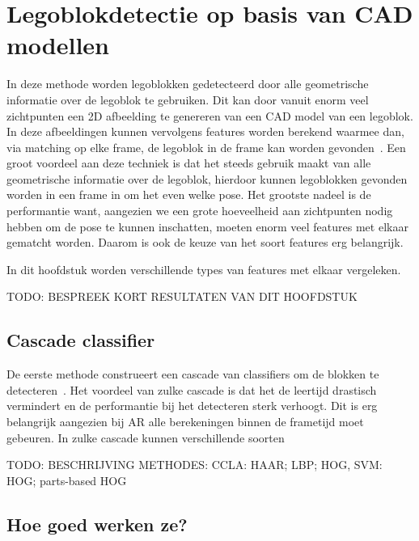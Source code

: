 \chapter{Legoblokdetectie op basis van CAD modellen}
\label{hoofdstuk:3}
In deze methode worden legoblokken gedetecteerd door alle geometrische informatie over de legoblok te gebruiken. Dit kan door vanuit enorm veel zichtpunten een 2D afbeelding te genereren van een CAD model van een legoblok. In deze afbeeldingen kunnen vervolgens features worden berekend waarmee dan, via matching op elke frame, de legoblok in de frame kan worden gevonden~\cite{aubry2014seeing}. Een groot voordeel aan deze techniek is dat het steeds gebruik maakt van alle geometrische informatie over de legoblok, hierdoor kunnen legoblokken gevonden worden in een frame in om het even welke pose. Het grootste nadeel is de performantie want, aangezien we een grote hoeveelheid aan zichtpunten nodig hebben om de pose te kunnen inschatten, moeten enorm veel features met elkaar gematcht worden. Daarom is ook de keuze van het soort features erg belangrijk.

In dit hoofdstuk worden verschillende types van features met elkaar vergeleken.

TODO: BESPREEK KORT RESULTATEN VAN DIT HOOFDSTUK %

\section{Cascade classifier}
De eerste methode construeert een cascade van classifiers om de blokken te detecteren~\cite{viola2001rapid}. Het voordeel van zulke cascade is dat het de leertijd drastisch vermindert en de performantie bij het detecteren sterk verhoogt. Dit is erg belangrijk aangezien bij AR alle berekeningen binnen de frametijd moet gebeuren. In zulke cascade kunnen verschillende soorten 

TODO: BESCHRIJVING METHODES: CCLA: HAAR; LBP; HOG, SVM: HOG; parts-based HOG %

%

\section{Hoe goed werken ze?}


